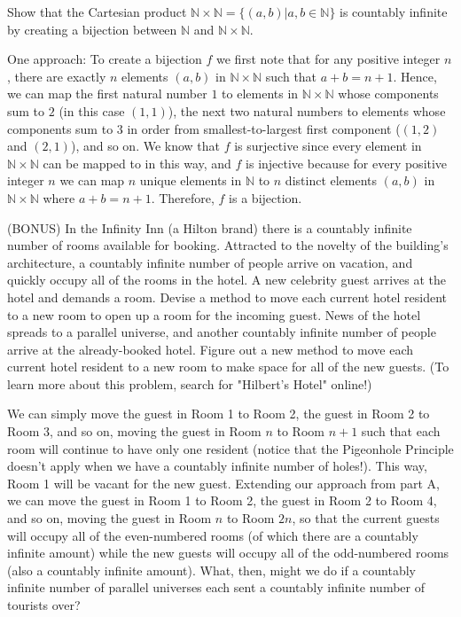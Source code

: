 \documentclass[solution, letterpaper]{cs20inclass}
\begin{document}
\problem Show that the Cartesian product $\mathbb{N} \times \mathbb{N} = \{(a,b)|a,b \in \mathbb{N}\}$ is countably infinite by creating a bijection between $\mathbb{N}$ and $\mathbb{N} \times \mathbb{N}$.

\begin{solution}
One approach: To create a bijection $f$ we first note that for any positive integer $n$, there are exactly $n$ elements $(a,b)$ in $\mathbb{N} \times \mathbb{N} $ such that $a + b = n + 1$. Hence, we can map the first natural number $1$ to elements in $\mathbb{N} \times \mathbb{N} $ whose components sum to $2$ (in this case $(1,1)$), the next two natural numbers to elements whose components sum to $3$ in order from smallest-to-largest first component ($(1,2)$ and $(2,1)$), and so on. We know that $f$ is surjective since every element in $\mathbb{N} \times \mathbb{N} $ can be mapped to in this way, and $f$ is injective because for every positive integer $n$ we can map $n$ unique elements in $\mathbb{N}$ to $n$ distinct elements $(a,b)$ in $\mathbb{N} \times \mathbb{N} $ where $a + b = n + 1$. Therefore, $f$ is a bijection.
\end{solution}

\problem (BONUS) In the Infinity Inn (a Hilton brand) there is a countably infinite number of rooms available for booking. Attracted to the novelty of the building's architecture, a countably infinite number of people arrive on vacation, and quickly occupy all of the rooms in the hotel.
\subproblem A new celebrity guest arrives at the hotel and demands a room. Devise a method to move each current hotel resident to a new room to open up a room for the incoming guest.
\subproblem News of the hotel spreads to a parallel universe, and another countably infinite number of people arrive at the already-booked hotel. Figure out a new method to move each current hotel resident to a new room to make space for all of the new guests. (To learn more about this problem, search for "Hilbert's Hotel" online!)

\begin{solution}
\subsolution We can simply move the guest in Room 1 to Room 2, the guest in Room 2 to Room 3, and so on, moving the guest in Room $n$ to Room $n+1$ such that each room will continue to have only one resident (notice that the Pigeonhole Principle doesn't apply when we have a countably infinite number of holes!). This way, Room 1 will be vacant for the new guest.
\subsolution Extending our approach from part A, we can move the guest in Room 1 to Room 2, the guest in Room 2 to Room 4, and so on, moving the guest in Room $n$ to Room $2n$, so that the current guests will occupy all of the even-numbered rooms (of which there are a countably infinite amount) while the new guests will occupy all of the odd-numbered rooms (also a countably infinite amount). What, then, might we do if a countably infinite number of parallel universes each sent a countably infinite number of tourists over?
\end{solution}
\end{document}
